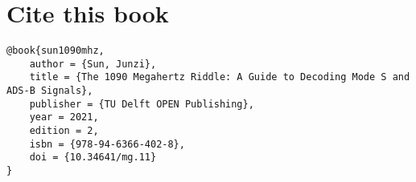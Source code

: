 



\chapter{Cite this book}

\begin{verbatim}
@book{sun1090mhz,
    author = {Sun, Junzi}, 
    title = {The 1090 Megahertz Riddle: A Guide to Decoding Mode S and ADS-B Signals},
    publisher = {TU Delft OPEN Publishing},
    year = 2021,
    edition = 2,
    isbn = {978-94-6366-402-8},
    doi = {10.34641/mg.11}
}
\end{verbatim}